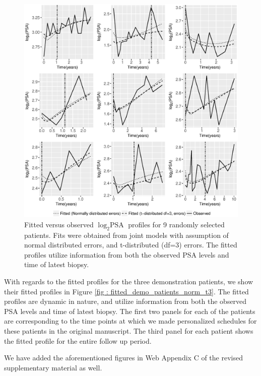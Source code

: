 \begin{enumerate}
    \begin{figure}[!htb]
    \centerline{\includegraphics[width=\columnwidth]{images/model_fit/subject_fittedVsObserved_psa_norm_t3.eps}}
    \caption{Fitted versus observed $\log_2 \mbox{PSA}$ profiles for 9 randomly selected patients. Fits were obtained from joint models with assumption of normal distributed errors, and t-distributed (df=3) errors. The fitted profiles utilize information from both the observed PSA levels and time of latest biopsy.}
    \label{fig : subject_fittedVsObserved_psa_norm_t3_ref2}
    \end{figure}

    With regards to the fitted profiles for the three demonstration patients, we show their fitted profiles in Figure \ref{fig : fitted_demo_patients_norm_t3}. The fitted profiles are dynamic in nature, and utilize information from both the observed PSA levels and time of latest biopsy. The first two panels for each of the patients are corresponding to the time points at which we made personalized schedules for these patients in the original manuscript. The third panel for each patient shows the fitted profile for the entire follow up period.

    We have added the aforementioned figures in Web Appendix C of the revised supplementary material as well.
    

\end{enumerate}
